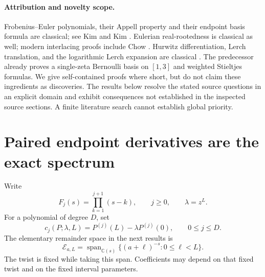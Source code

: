 \documentclass[11pt,letterpaper]{article}
\numberwithin{equation}{section}
\theoremstyle{definition}
\theoremstyle{remark}\newtheorem{remark}[theorem]{Remark}
\newcommand{\C}{\mathbb C}\newcommand{\Q}{\mathbb Q}
\newcommand{\E}{\mathcal E}
\DeclareMathOperator{\Span}{span}
\begin{document}
\paragraph{Attribution and novelty scope.}
Frobenius--Euler polynomials, their Appell property and their endpoint
basis formula are classical; see Kim and Kim \cite{KimKim}. Eulerian
real-rootedness is classical as well; modern interlacing proofs include
Chow \cite{Chow}. Hurwitz differentiation, Lerch translation, and the
logarithmic Lerch expansion are classical \cite{DLMFHurwitz,DLMFLerch}.
The predecessor already proves a single-zeta Bernoulli basis on $[1,3]$
and weighted Stieltjes formulas. We give self-contained proofs where
short, but do not claim these ingredients as discoveries. The results
below resolve the stated source questions in an explicit domain and
exhibit consequences not established in the inspected source sections.
A finite literature search cannot establish global priority.

\section{Paired endpoint derivatives are the exact spectrum}
\label{pls:sec:endpoints}

Write
\begin{equation}\label{pls:eq:F}
 F_j(s)=\prod_{k=1}^{j+1}(s-k),\qquad j\ge0,
 \qquad \lambda=z^L.
\end{equation}
For a polynomial of degree $D$, set
\begin{equation}\label{pls:eq:c}
 c_j(P;\lambda,L)=P^{(j)}(L)-\lambda P^{(j)}(0),
 \qquad 0\le j\le D.
\end{equation}
The elementary remainder space in the next results is
\begin{equation}\label{pls:eq:elementary}
 \E_{a,L}=\Span_{\C(s)}\{(a+\ell)^{-s}:0\le\ell<L\}.
\end{equation}
The twist is fixed while taking this span. Coefficients may depend on
that fixed twist and on the fixed interval parameters.
\end{document}
